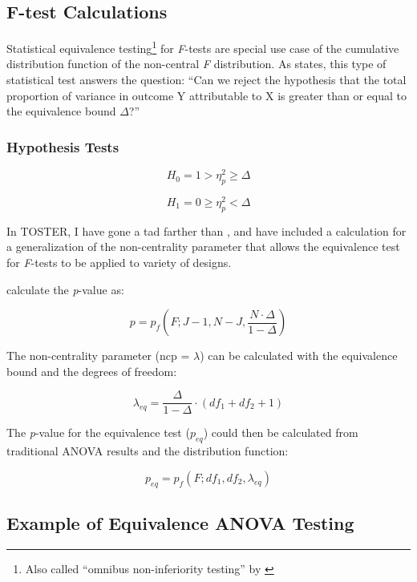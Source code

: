 \documentclass[]{interact}
\theoremstyle{plain}%
\theoremstyle{definition}
\theoremstyle{remark}
\begin{document}
\hypertarget{f-test-calculations}{%
\subsection{F-test Calculations}\label{f-test-calculations}}

Statistical equivalence testing\footnote{Also called ``omnibus
  non-inferiority testing'' by \citet{Campbell_2021}} for \emph{F}-tests
are special use case of the cumulative distribution function of the
non-central \emph{F} distribution. As \citet{Campbell_2021} states, this
type of statistical test answers the question: ``Can we reject the
hypothesis that the total proportion of variance in outcome Y
attributable to X is greater than or equal to the equivalence bound
\(\Delta\)?''

\hypertarget{hypothesis-tests}{%
\subsubsection{Hypothesis Tests}\label{hypothesis-tests}}

\[
H_0 =  1 > \eta^2_p \geq \Delta
\]

\[
H_1 =  0 \geq \eta^2_p < \Delta
\]

In TOSTER, I have gone a tad farther than \citet{Campbell_2021}, and
have included a calculation for a generalization of the non-centrality
parameter that allows the equivalence test for \emph{F}-tests to be
applied to variety of designs.

\citet{Campbell_2021} calculate the \emph{p}-value as:

\[
p = p_f(F; J-1, N-J, \frac{N \cdot \Delta}{1-\Delta})
\]

The non-centrality parameter (ncp = \(\lambda\)) can be calculated with
the equivalence bound and the degrees of freedom:

\[
\lambda_{eq} = \frac{\Delta}{1-\Delta} \cdot(df_1 + df_2 +1)
\]

\newpage

The \emph{p}-value for the equivalence test (\(p_{eq}\)) could then be
calculated from traditional ANOVA results and the distribution function:

\[
p_{eq} = p_f(F; df_1, df_2, \lambda_{eq})
\]

\hypertarget{example-of-equivalence-anova-testing}{%
\subsection{Example of Equivalence ANOVA
Testing}\label{example-of-equivalence-anova-testing}}
\end{document}
